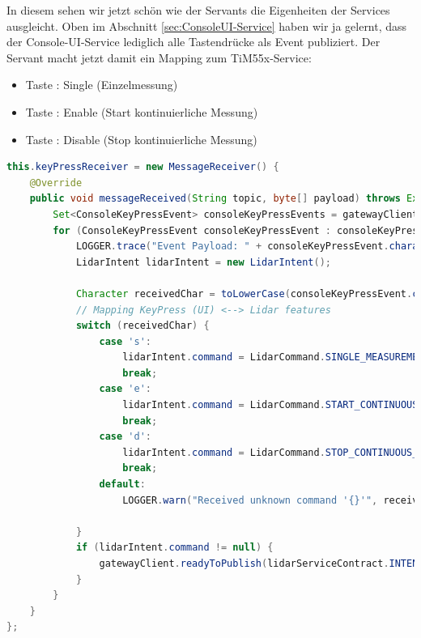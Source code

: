 In diesem  sehen wir jetzt schön wie der Servants die Eigenheiten der Services ausgleicht. Oben im Abschnitt \ref{sec:ConsoleUI-Service} haben wir ja gelernt, dass der Console-UI-Service lediglich alle Tastendrücke als Event publiziert. Der Servant macht jetzt damit ein Mapping zum TiM55x-Service:
\begin{itemize}
	\item Taste : Single (Einzelmessung)
	\item Taste : Enable (Start kontinuierliche Messung)
	\item Taste : Disable (Stop kontinuierliche Messung)
\end{itemize}
\begin{lstlisting}[language=Java,caption={MessageReceiver für die keyPress-Evemts einer ConsoleUI-Instanz im Servant},label={lst:servant-uiConnectionStatusReceiver}]
this.keyPressReceiver = new MessageReceiver() {
    @Override
    public void messageReceived(String topic, byte[] payload) throws Exception {
        Set<ConsoleKeyPressEvent> consoleKeyPressEvents = gatewayClient.toMessageSet(payload, ConsoleKeyPressEvent.class);
        for (ConsoleKeyPressEvent consoleKeyPressEvent : consoleKeyPressEvents) {
            LOGGER.trace("Event Payload: " + consoleKeyPressEvent.character);
            LidarIntent lidarIntent = new LidarIntent();

            Character receivedChar = toLowerCase(consoleKeyPressEvent.character);
            // Mapping KeyPress (UI) <--> Lidar features
            switch (receivedChar) {
                case 's':
                    lidarIntent.command = LidarCommand.SINGLE_MEASUREMENT;
                    break;
                case 'e':
                    lidarIntent.command = LidarCommand.START_CONTINUOUS_MEASUREMENT;
                    break;
                case 'd':
                    lidarIntent.command = LidarCommand.STOP_CONTINUOUS_MEASUREMENT;
                    break;
                default:
                    LOGGER.warn("Received unknown command '{}'", receivedChar);

            }
            if (lidarIntent.command != null) {
                gatewayClient.readyToPublish(lidarServiceContract.INTENT, lidarIntent);
            }
        }
    }
};
\end{lstlisting}

